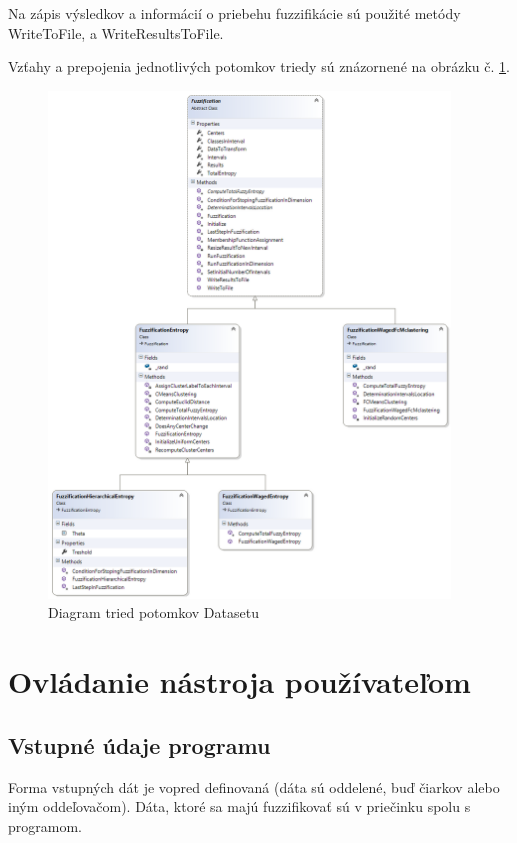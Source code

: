 Na zápis výsledkov a informácií o priebehu fuzzifikácie sú použité metódy WriteToFile, a WriteResultsToFile. 

Vzťahy a prepojenia jednotlivých potomkov triedy sú znázornené na obrázku č. \ref{fig:umlalgoritmov}.

\begin{figure}[ht]
\includegraphics[width=0.95\textwidth]{obrazky/umlalgoritmov.png}
\centering
\caption{Diagram tried potomkov Datasetu } 
\label{fig:umlalgoritmov}
\end{figure}

\section{Ovládanie nástroja používateľom}

\subsection{Vstupné údaje programu}

Forma vstupných dát je vopred definovaná (dáta sú oddelené, buď čiarkov alebo iným oddeľovačom). Dáta, ktoré sa majú fuzzifikovať sú v priečinku spolu s programom. 

